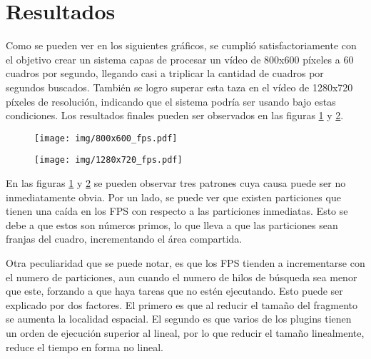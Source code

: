 \section{Resultados}

Como se pueden ver en los siguientes gráficos, se cumplió satisfactoriamente con
el objetivo crear un sistema capas de procesar un vídeo de 800x600 píxeles a 60
cuadros por segundo, llegando casi a triplicar la cantidad de cuadros por
segundos buscados. También se logro superar esta taza en el vídeo de 1280x720
píxeles de resolución, indicando que el sistema podría ser usando bajo estas
condiciones. Los resultados finales pueden ser observados en las figuras
\ref{800fps} y \ref{1280fps}.

\begin{figure}[h]

	\texttt{[image: img/800x600\_fps.pdf]}
	\caption{}
	\label{800fps}

\end{figure}

\begin{figure}[h]

	\texttt{[image: img/1280x720\_fps.pdf]}
	\caption{}
	\label{1280fps}

\end{figure}

En las figuras \ref{800fps} y \ref{1280fps} se pueden observar tres patrones
cuya causa puede ser no inmediatamente obvia. Por un lado, se puede ver que
existen particiones que tienen una caída en los FPS con respecto a las
particiones inmediatas. Esto se debe a que estos son números primos, lo que
lleva a que las particiones sean franjas del cuadro, incrementando el área
compartida.

Otra peculiaridad que se puede notar, es que los FPS tienden a incrementarse con
el numero de particiones, aun cuando el numero de hilos de búsqueda sea menor
que este, forzando a que haya tareas que no estén ejecutando. Esto puede ser
explicado por dos factores. El primero es que al reducir el tamaño del fragmento
se aumenta la localidad espacial. El segundo es que varios de los plugins tienen
un orden de ejecución superior al lineal, por lo que reducir el tamaño
linealmente, reduce el tiempo en forma no lineal.

